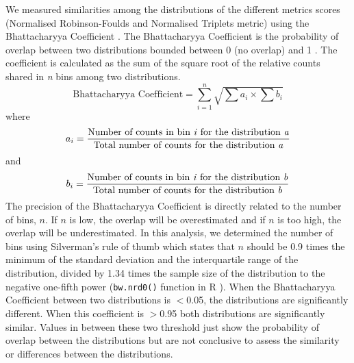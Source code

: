 We measured similarities among the distributions of the different metrics scores (Normalised Robinson-Foulds and Normalised Triplets metric) using the Bhattacharyya Coefficient \citep{Bhattacharyya}.
The Bhattacharyya Coefficient is the probability of overlap between two distributions bounded between 0 (no overlap) and 1 \citep[full overlap;]{Bhattacharyya}.
The coefficient is calculated as the sum of the square root of the relative counts shared in \textit{n} bins among two distributions.
\begin{equation}
\text{Bhattacharyya Coefficient}=\sum_{i=1}^{n} \sqrt{{\sum{a_i}}\times{\sum{b_i}}}
\end{equation}
where
\begin{equation}
{a_i}=\frac{\text{Number of counts in bin \textit{i} for the distribution \textit{a}}}{\text{Total number of counts for the distribution \textit{a}}}
\end{equation}
and
\begin{equation}
{b_i}=\frac{\text{Number of counts in bin \textit{i} for the distribution \textit{b}}}{\text{Total number of counts for the distribution \textit{b}}}
\end{equation}
The precision of the Bhattacharyya Coefficient is directly related to the number of bins, $n$. If $n$ is low, the overlap will be overestimated and if $n$ is too high, the overlap will be underestimated. In this analysis, we determined the number of bins using Silverman's rule of thumb which states that $n$ should be 0.9 times the minimum of the standard deviation and the interquartile range of the distribution, divided by 1.34 times the sample size of the distribution to the negative one-fifth power (\texttt{bw.nrd0()} function in R \citep{silverman1986density}).
When the Bhattacharyya Coefficient between two distributions is $<$0.05, the distributions are significantly different.
When this coefficient is $>$0.95 both distributions are significantly similar.
Values in between these two threshold just show the probability of overlap between the distributions but are not conclusive to assess the similarity or differences between the distributions.

